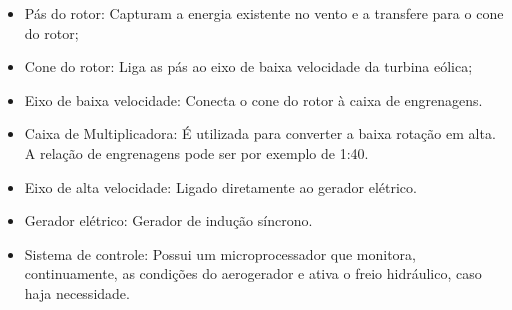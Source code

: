 \begin{itemize}
\item Pás do rotor: Capturam a energia existente no vento e a transfere para o cone do rotor; 
\item Cone do rotor: Liga as pás ao eixo de baixa velocidade da turbina eólica;
\item Eixo de baixa velocidade: Conecta o cone do rotor à caixa de engrenagens. 
\item Caixa de Multiplicadora: É utilizada para converter a baixa rotação em alta. A relação de engrenagens pode ser por exemplo de 1:40.
\item Eixo de alta velocidade: Ligado diretamente ao gerador elétrico. 
\item Gerador elétrico: Gerador de indução síncrono. 
\item Sistema de controle: Possui um microprocessador que monitora, continuamente, as condições do aerogerador e ativa o freio hidráulico, caso haja necessidade.
\end{itemize}